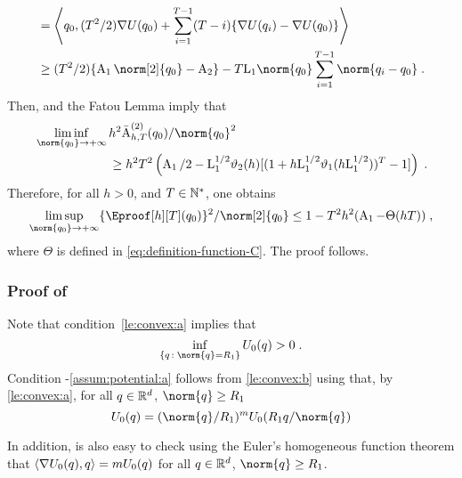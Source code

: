 \begin{enumerate}[label=(\alph*),leftmargin=0cm,itemindent=0.5cm,labelwidth=1.2\itemindent,labelsep=0cm,align=left]
\begin{align}
&= \ps{\q_0}{ (T^2/2)  \nabla \F(\q_0)+ \sum_{i=1}^{T-1}(T-i)\{\nabla \F (\q_i) - \nabla U(q_0)\}}  \\
&\geq  (T^2/2) \{\constthree  \norm[2]{q_0} - \constfour\} - T \constzero \norm{q_0} \sum_{i=1}^{T-1}\norm{ q_i - q_0 }  \eqsp.
\end{align}
Then,  and the Fatou Lemma imply that
\begin{align}
& \liminf_{\norm{q_0} \to \plusinfty} h^2 \bar{\operatorname{A}}^{(2)}_{h,T}(\q_0)/\norm{q_0}^2  \\
 & \qquad \qquad  \qquad  \geq
h^2 T^2  \left( \constthree/2 - \constzero^{1/2} \vartheta_2(h) [(1+ h \constzero^{1/2}\vartheta_1(h \constzero^{1/2}))^T-1]\right)  \eqsp.
\end{align}
Therefore, for all  $h > 0$, and $T \in \mathbb{N}^*$, one obtains
\[
\limsup_{\norm{q_0} \to \plusinfty} \{ \Eproof[h][T](\q_0) \}^2  /\norm[2]{q_0}   \leq 1 -  T^2 h^2 (\constthree -  \Theta(hT))  \eqsp,
\]
where $\Theta$ is defined in \eqref{eq:definition-function-C}. The proof follows.
\end{enumerate}


\subsubsection{Proof of }
\label{sec:proof-crefle:convex}

Note that condition~\ref{le:convex:a}  implies that
\begin{equation}
  \label{eq:le:convex:b:conseq}
  \inf_{\set{\q}{\norm{\q}=\Rexp}} \F_0(\q) >0 \eqsp.
\end{equation}
Condition -\ref{assum:potential:a} follows from \ref{le:convex:b} using that, by \ref{le:convex:a},
 for all $q \in \mathbb{R}^d$, $\norm{q} \geq \Rexp$
\[
\F_0(q) =  (\norm{q}/\Rexp)^{\m}\F_0 (\Rexp  q / \norm{q} ) 
\]

  In addition,  is also
  easy to check using the Euler's homogeneous function theorem that
$\left\langle\nabla U_0(q),
 q \right\rangle= m U_0(q)$ for all $q \in \mathbb{R}^d$, $\norm{\q} \geq \Rexp$.

